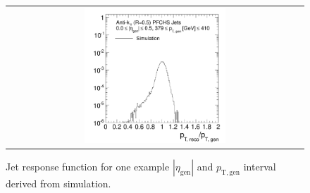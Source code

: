 \begin{figure}[!tp]
  \centering
  \begin{tabular}{c}
                \includegraphics[width=0.49\textwidth]{figures/TruthResponse_example_final_nominal_v4.pdf}
  \end{tabular}
  \caption{Jet response function for one example $|\eta_\mathrm{gen}|$ and $p_\mathrm{T, gen}$ interval derived from simulation.}
  \label{fig:response}
\end{figure}
